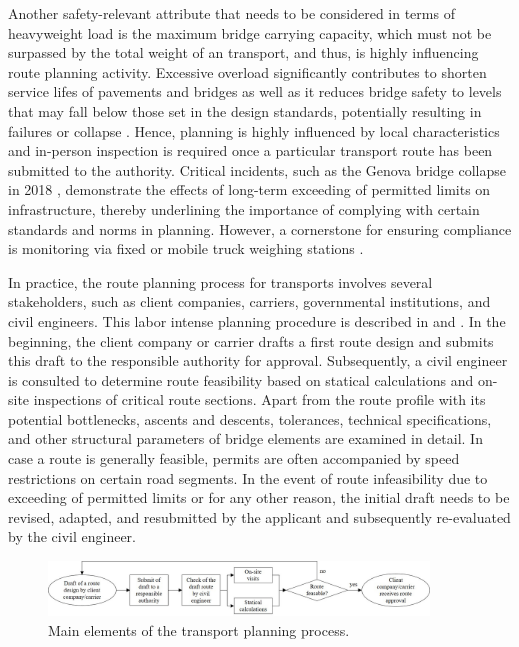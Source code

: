 Another safety-relevant attribute that needs to be considered in terms of heavyweight load is the maximum bridge carrying capacity, which must not be surpassed by the total weight of an \ohc transport, and thus, is highly influencing route planning activity.
Excessive overload significantly contributes to shorten service lifes of pavements and bridges as well as it reduces bridge safety to levels that may fall below those set in the design standards, potentially resulting in failures or collapse \cite{fiorillo2018fragility, yan2018optimal, ghosn2000development, wu2019assessment, lou2016effect}. Hence, planning is highly influenced by local characteristics and in-person inspection is required once a particular transport route has been submitted to the authority.
Critical incidents, such as the Genova bridge collapse in 2018 \cite{Morgese.2020, MorandiNYTimes},  demonstrate the effects of long-term exceeding of permitted limits on infrastructure, thereby underlining the importance of complying with certain standards and norms in \ohc planning. However, a cornerstone for ensuring compliance is monitoring via fixed or mobile truck weighing stations \cite{fiorillo2016minimizing}.
\par In practice, the route planning process for \ohc transports involves several stakeholders, such as client companies, carriers, governmental institutions, and civil engineers.
This labor intense planning procedure is described in \cite{Osegueda.1999} and \cite{ray2007web}. In the beginning, the client company or carrier drafts a first route design and submits this draft to the responsible authority for approval.
Subsequently, a civil engineer is consulted to determine route feasibility based on statical calculations and on-site inspections of critical route sections. Apart from the route profile with its potential bottlenecks, ascents and descents, tolerances, technical specifications, and other structural parameters of bridge elements are examined in detail. In case a route is generally feasible, permits are often accompanied by speed restrictions on certain road segments. In the event of route infeasibility due to exceeding of permitted limits or for any other reason, the initial draft needs to be revised, adapted, and resubmitted by the applicant and subsequently re-evaluated by the civil engineer.


\begin{figure}[!ht]
  \centering
  \includegraphics[width=0.9\textwidth]{final.jpg}
  \caption{Main elements of the \ohc transport planning process.}
  \label{fig:higher level}
\end{figure}

